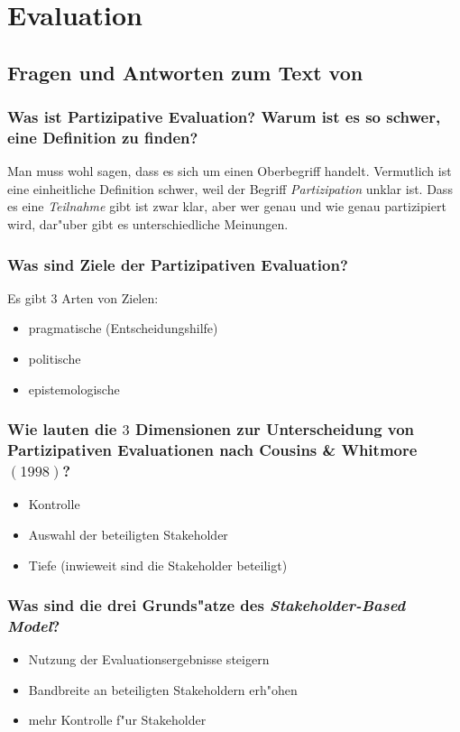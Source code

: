 \section{Evaluation}
\subsection{Fragen und Antworten zum Text von \textcite{cullen_forms_2011}}
\subsubsection{Was ist Partizipative Evaluation? Warum ist es so schwer, eine Definition zu finden?}
Man muss wohl sagen, dass es sich um einen Oberbegriff handelt. Vermutlich ist eine einheitliche Definition schwer, weil der Begriff \emph{Partizipation} unklar ist. Dass es eine \emph{Teilnahme} gibt ist zwar klar, aber wer genau und wie genau partizipiert wird, dar"uber gibt es unterschiedliche Meinungen.

\subsubsection{Was sind Ziele der Partizipativen Evaluation?}
Es gibt $3$ Arten von Zielen:
\begin{itemize}
        \item pragmatische (Entscheidungshilfe)
        \item politische 
        \item epistemologische
\end{itemize}

\subsubsection{Wie lauten die $3$ Dimensionen zur Unterscheidung von Partizipativen Evaluationen nach Cousins \& Whitmore $(1998)$?}
\begin{itemize}
        \item Kontrolle
        \item Auswahl der beteiligten Stakeholder
        \item Tiefe (inwieweit sind die Stakeholder beteiligt)
\end{itemize}

\subsubsection{Was sind die drei Grunds"atze des \emph{Stakeholder-Based Model}?}
\begin{itemize}
        \item Nutzung der Evaluationsergebnisse steigern
        \item Bandbreite an beteiligten Stakeholdern erh"ohen
        \item mehr Kontrolle f"ur Stakeholder
\end{itemize}

